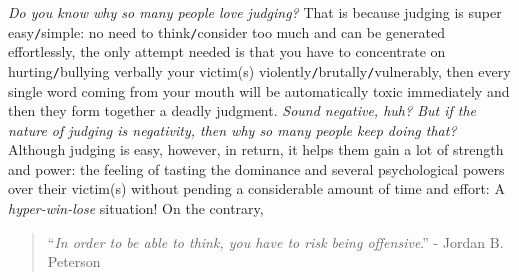 \documentclass[12pt]{article}
\numberwithin{equation}{section}
\begin{document}
\textit{Do you know why so many people love judging?} That is because judging is super easy\texttt{/}simple: no need to think\texttt{/}consider too much and can be generated effortlessly, the only attempt needed is that you have to concentrate on hurting\texttt{/}bullying verbally your victim(s) violently\texttt{/}brutally\texttt{/}vulnerably, then every single word coming from your mouth will be automatically toxic immediately and then they form together a deadly judgment. \textit{Sound negative, huh? But if the nature of judging is negativity, then why so many people keep doing that?} Although judging is easy, however, in return, it helps them gain a lot of strength and power: the feeling of tasting the dominance and several psychological powers over their victim(s) without pending a considerable amount of time and effort: A \textit{hyper-win-lose} situation! On the contrary,
\begin{quotation}
    ``\textit{In order to be able to think, you have to risk being offensive}.'' - Jordan B. Peterson
\end{quotation}
\end{document}

